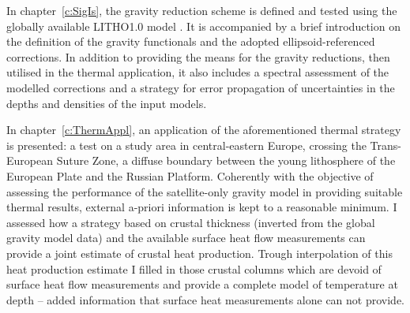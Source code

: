In chapter~\ref{c:SigIs}, the gravity reduction scheme is defined and tested using the globally available {LITHO1.0} model \parencite{Pasyanos2014}.
It is accompanied by a brief introduction on the definition of the gravity functionals and the adopted ellipsoid-referenced corrections.
In addition to providing the means for the gravity reductions, then utilised in the thermal application, it also includes a spectral assessment of the modelled corrections and a strategy for error propagation of uncertainties in the depths and densities of the input models.

In chapter~\ref{c:ThermAppl}, an application of the aforementioned thermal strategy is presented: a test on a study area in central-eastern Europe, crossing the Trans-European Suture Zone, a diffuse boundary between the young lithosphere of the European Plate and the Russian Platform.
Coherently with the objective of assessing the performance of the satellite-only gravity model in providing suitable thermal results, external a-priori information is kept to a reasonable minimum.
I assessed how a strategy based on crustal thickness (inverted from the global gravity model data) and the available surface heat flow measurements can provide a joint estimate of crustal heat production.
Trough interpolation of this heat production estimate I filled in those crustal columns which are devoid of surface heat flow measurements and provide a complete model of temperature at depth -- added information that surface heat measurements alone can not provide.
